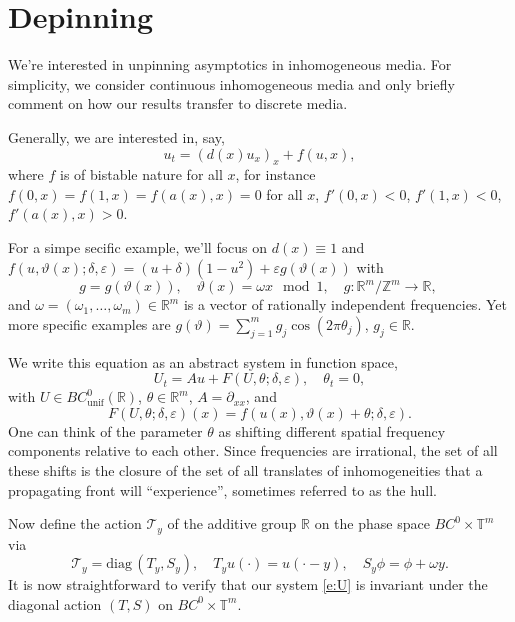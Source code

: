 \documentclass[letterpaper,11pt]{article}
\newcommand{\R}{\mathbb{R}}
\newcommand{\Z}{\mathbb{Z}}
\newcommand{\T}{\mathbb{T}}
\numberwithin{equation}{section}
\theoremstyle{plain}
\begin{document}
\section{Depinning}

We're interested in unpinning asymptotics in inhomogeneous media. For simplicity, we consider continuous inhomogeneous media and only briefly comment on how our results transfer to discrete media. 

Generally, we are interested in, say, 
\[
u_t = (d(x)u_x)_x + f(u,x),
\]
where $f$ is of bistable nature for all $x$, for instance $f(0,x)=f(1,x)=f(a(x),x)=0$ for all $x$, $f'(0,x)<0$, $f'(1,x)<0$, $f'(a(x),x)>0$. 

For a simpe secific example, we'll focus on $d(x)\equiv 1$ and $f(u,\vartheta(x);\delta,\varepsilon)=(u+\delta)(1-u^2)+\varepsilon g(\vartheta(x))$ with 
\[
g=g(\vartheta(x)),\quad \vartheta(x)=\omega x \mod 1,\quad g:\R^m/\Z^m\to \R,\ 
\]
and $\omega=(\omega_1,\ldots,\omega_m)\in\R^m$ is a vector of rationally independent frequencies. Yet more specific examples are $g(\vartheta)=\sum_{j=1}^m g_j \cos(2\pi \theta_j)$, $g_j\in\R$. 


We write this equation as an abstract system in function space, 
\begin{equation}\label{e:U}
U_t=Au+F(U,\theta;\delta,\varepsilon),\quad \theta_t=0,
\end{equation}
with $U\in BC^0_\mathrm{unif}(\R)$, $\theta\in\R^m$, $A=\partial_{xx}$, and 
\[
F(U,\theta;\delta,\varepsilon)(x)=f(u(x),\vartheta(x)+\theta;\delta,\varepsilon).
\]
One can think of the parameter $\theta$ as shifting different spatial frequency components relative to each other. Since frequencies are irrational, the set of all these shifts is the closure of the set of all translates of inhomogeneities that a propagating front will ``experience'', sometimes referred to as the hull. 


Now define the action $\mathcal{T}_y$ of the additive group $\R$ on the phase space $BC^0\times \T^m$ via 
\[
\mathcal{T}_y=\mathrm{diag}\,(T_y,S_y), \quad T_y u(\cdot)=u(\cdot -y),\quad  S_y \phi = \phi+\omega y.
\]
It is now straightforward to verify that our system \eqref{e:U} is invariant under the diagonal action $(T,S)$ on $BC^0\times \T^m$. 
\end{document}
